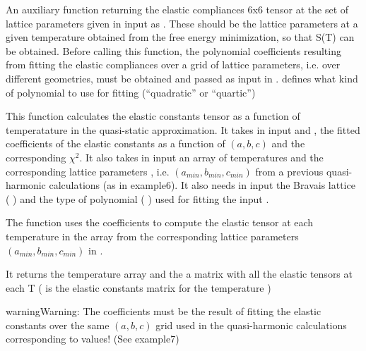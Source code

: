 \documentclass[letterpaper,10pt,english]{sphinxmanual}
\begin{document}
\begin{fulllineitems}
\label{pyqha:pyqha.fitC.fS}
An auxiliary function returning the elastic compliances 6x6 tensor at the
set of lattice parameters given in input as . These should be the
lattice parameters at a given temperature obtained from the free energy
minimization, so that S(T) can be obtained.
Before calling this function, the polynomial coefficients resulting from 
fitting the elastic compliances over a grid of lattice parameters, i.e. over
different geometries, must be obtained and passed as input in . 
 defines what kind of polynomial to use for fitting (``quadratic'' or
``quartic'')

\end{fulllineitems}


\begin{fulllineitems}
\label{pyqha:pyqha.fitC.fitCT}
This function calculates the elastic constants tensor  as a function of
temperatature in the quasi-static approximation.
It takes in input  and , the fitted coefficients of the elastic 
constants as a function of \((a,b,c)\) and the corresponding \(\chi^2\).
It also takes in input an array of temperatures  and the corresponding
lattice parameters , i.e. \((a_{min},b_{min},c_{min})\) from a 
previous quasi-harmonic calculations (as in example6). 
It also needs in input the Bravais lattice (  ) and the type of polynomial
(  ) used for fitting the input .

The function uses the coefficients  to compute the elastic tensor at
each temperature in the array  from the corresponding lattice parameters
\((a_{min},b_{min},c_{min})\) in .

It returns the temperature array and the a matrix  with all the elastic
tensors at each T (  is the elastic constants matrix for the 
temperature )

\begin{sphinxadmonition}{warning}{Warning:}
The coefficients  must be the result of fitting the elastic constants
over the same \((a,b,c)\) grid used in the quasi-harmonic calculations
corresponding to  values! (See example7)
\end{sphinxadmonition}

\end{fulllineitems}
\end{document}
